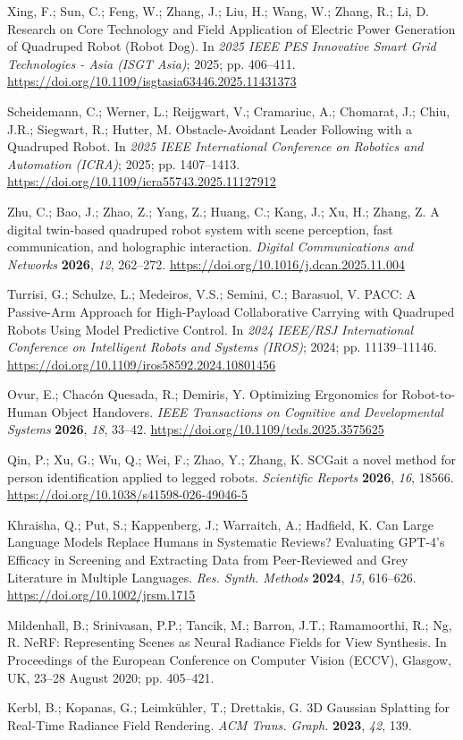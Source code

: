 Xing, F.; Sun, C.; Feng, W.; Zhang, J.; Liu, H.; Wang, W.; Zhang, R.; Li, D. Research on Core Technology and Field Application of Electric Power Generation of Quadruped Robot (Robot Dog). In \emph{2025 IEEE PES Innovative Smart Grid Technologies - Asia (ISGT Asia)}; 2025; pp. 406--411. \url{https://doi.org/10.1109/isgtasia63446.2025.11431373}

Scheidemann, C.; Werner, L.; Reijgwart, V.; Cramariuc, A.; Chomarat, J.; Chiu, J.R.; Siegwart, R.; Hutter, M. Obstacle-Avoidant Leader Following with a Quadruped Robot. In \emph{2025 IEEE International Conference on Robotics and Automation (ICRA)}; 2025; pp. 1407--1413. \url{https://doi.org/10.1109/icra55743.2025.11127912}

Zhu, C.; Bao, J.; Zhao, Z.; Yang, Z.; Huang, C.; Kang, J.; Xu, H.; Zhang, Z. A digital twin-based quadruped robot system with scene perception, fast communication, and holographic interaction. \emph{Digital Communications and Networks} \textbf{2026}, \emph{12}, 262--272. \url{https://doi.org/10.1016/j.dcan.2025.11.004}

Turrisi, G.; Schulze, L.; Medeiros, V.S.; Semini, C.; Barasuol, V. PACC: A Passive-Arm Approach for High-Payload Collaborative Carrying with Quadruped Robots Using Model Predictive Control. In \emph{2024 IEEE/RSJ International Conference on Intelligent Robots and Systems (IROS)}; 2024; pp. 11139--11146. \url{https://doi.org/10.1109/iros58592.2024.10801456}

Ovur, E.; Chacón Quesada, R.; Demiris, Y. Optimizing Ergonomics for Robot-to-Human Object Handovers. \emph{IEEE Transactions on Cognitive and Developmental Systems} \textbf{2026}, \emph{18}, 33--42. \url{https://doi.org/10.1109/tcds.2025.3575625}

Qin, P.; Xu, G.; Wu, Q.; Wei, F.; Zhao, Y.; Zhang, K. SCGait a novel method for person identification applied to legged robots. \emph{Scientific Reports} \textbf{2026}, \emph{16}, 18566. \url{https://doi.org/10.1038/s41598-026-49046-5}

Khraisha, Q.; Put, S.; Kappenberg, J.; Warraitch, A.; Hadfield, K. Can Large
Language Models Replace Humans in Systematic Reviews? Evaluating GPT-4's
Efficacy in Screening and Extracting Data from Peer-Reviewed and Grey
Literature in Multiple Languages. {\em Res. Synth. Methods} {\bf 2024},
{\em 15}, 616--626. \url{https://doi.org/10.1002/jrsm.1715}

Mildenhall, B.; Srinivasan, P.P.; Tancik, M.; Barron, J.T.; Ramamoorthi, R.;
Ng, R. NeRF: Representing Scenes as Neural Radiance Fields for View
Synthesis. In Proceedings of the European Conference on Computer Vision
(ECCV), Glasgow, UK, 23--28 August 2020; pp. 405--421.

Kerbl, B.; Kopanas, G.; Leimk\"{u}hler, T.; Drettakis, G. 3D Gaussian
Splatting for Real-Time Radiance Field Rendering. \emph{ACM Trans. Graph.}
\textbf{2023}, \emph{42}, 139.
